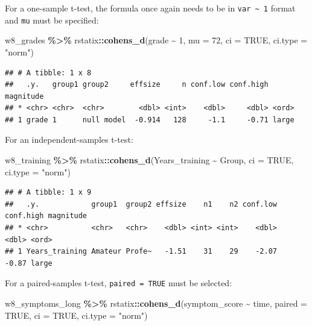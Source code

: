 \documentclass[
]{book}
\newenvironment{Shaded}{\begin{snugshade}}{\end{snugshade}}
\newcommand{\AttributeTok}[1]{\textcolor[rgb]{0.13,0.29,0.53}{#1}}
\newcommand{\ConstantTok}[1]{\textcolor[rgb]{0.56,0.35,0.01}{#1}}
\newcommand{\DecValTok}[1]{\textcolor[rgb]{0.00,0.00,0.81}{#1}}
\newcommand{\FunctionTok}[1]{\textcolor[rgb]{0.13,0.29,0.53}{\textbf{#1}}}
\newcommand{\NormalTok}[1]{#1}
\newcommand{\SpecialCharTok}[1]{\textcolor[rgb]{0.81,0.36,0.00}{\textbf{#1}}}
\newcommand{\StringTok}[1]{\textcolor[rgb]{0.31,0.60,0.02}{#1}}
\begin{document}
For a one-sample t-test, the formula once again needs to be in \texttt{var\ \textasciitilde{}\ 1} format and \texttt{mu} must be specified:

\begin{Shaded}
\begin{Highlighting}[]
\NormalTok{w8\_grades }\SpecialCharTok{\%\textgreater{}\%} 
\NormalTok{  rstatix}\SpecialCharTok{::}\FunctionTok{cohens\_d}\NormalTok{(grade }\SpecialCharTok{\textasciitilde{}} \DecValTok{1}\NormalTok{, }\AttributeTok{mu =} \DecValTok{72}\NormalTok{, }\AttributeTok{ci =} \ConstantTok{TRUE}\NormalTok{, }\AttributeTok{ci.type =} \StringTok{"norm"}\NormalTok{) }
\end{Highlighting}
\end{Shaded}

\begin{verbatim}
## # A tibble: 1 x 8
##   .y.   group1 group2     effsize     n conf.low conf.high magnitude
## * <chr> <chr>  <chr>        <dbl> <int>    <dbl>     <dbl> <ord>    
## 1 grade 1      null model  -0.914   128     -1.1     -0.71 large
\end{verbatim}

For an independent-samples t-test:

\begin{Shaded}
\begin{Highlighting}[]
\NormalTok{w8\_training }\SpecialCharTok{\%\textgreater{}\%}
\NormalTok{  rstatix}\SpecialCharTok{::}\FunctionTok{cohens\_d}\NormalTok{(Years\_training }\SpecialCharTok{\textasciitilde{}}\NormalTok{ Group, }\AttributeTok{ci =} \ConstantTok{TRUE}\NormalTok{, }\AttributeTok{ci.type =} \StringTok{"norm"}\NormalTok{)}
\end{Highlighting}
\end{Shaded}

\begin{verbatim}
## # A tibble: 1 x 9
##   .y.            group1  group2 effsize    n1    n2 conf.low conf.high magnitude
## * <chr>          <chr>   <chr>    <dbl> <int> <int>    <dbl>     <dbl> <ord>    
## 1 Years_training Amateur Profe~   -1.51    31    29    -2.07     -0.87 large
\end{verbatim}

For a paired-samples t-test, \texttt{paired\ =\ TRUE} must be selected:

\begin{Shaded}
\begin{Highlighting}[]
\NormalTok{w8\_symptoms\_long }\SpecialCharTok{\%\textgreater{}\%}
\NormalTok{  rstatix}\SpecialCharTok{::}\FunctionTok{cohens\_d}\NormalTok{(symptom\_score }\SpecialCharTok{\textasciitilde{}}\NormalTok{ time, }\AttributeTok{paired =} \ConstantTok{TRUE}\NormalTok{, }\AttributeTok{ci =} \ConstantTok{TRUE}\NormalTok{, }\AttributeTok{ci.type =} \StringTok{"norm"}\NormalTok{)}
\end{Highlighting}
\end{Shaded}
\end{document}
